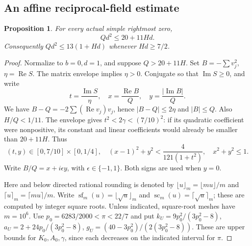 \documentclass[11pt,reqno]{amsart}
\numberwithin{equation}{section}
\newtheorem{proposition}[theorem]{Proposition}
\theoremstyle{definition}
\theoremstyle{remark}
\renewcommand{\Re}{\operatorname{Re}}
\renewcommand{\Im}{\operatorname{Im}}
\begin{document}
\subsection{An affine reciprocal-field estimate}

\begin{proposition}\label{mf:affine}
For every actual simple rightmost zero,
\begin{equation}\label{mf:affine-bound}
 Qd^2\le20+11Hd.
\end{equation}
Consequently $Qd^2\le13(1+Hd)$ whenever $Hd\ge7/2$.
\end{proposition}

\begin{proof}
Normalize to $b=0,d=1$, and suppose $Q>20+11H$.
Set $B=-\sum v_j^2$, $\eta=\Re S$.
The matrix envelope implies $\eta>0$. Conjugate so that
$\Im S\ge0$, and write
\[
 t=\frac{\Im S}{\eta},\quad
 x=\frac{\Re B}{Q},\quad y=\frac{|\Im B|}{Q}.
\]
We have $B-Q=-2\sum(\Re v_j)v_j$, hence
$|B-Q|\le2\eta$ and $|B|\le Q$. Also
$H/Q<1/11$. The envelope gives
$t^2<2\gamma<(7/10)^2$: if its quadratic coefficient were
nonpositive, its constant and linear coefficients would already
be smaller than $20+11H$. Thus
\begin{equation}\label{mf:affine-domain}
 (t,y)\in[0,7/10]\times[0,1/4],\quad
 (x-1)^2+y^2<\frac4{121(1+t^2)},\quad x^2+y^2\le1.
\end{equation}
Write $B/Q=x+i\epsilon y$, with $\epsilon\in\{-1,1\}$.
Both signs are used when $y=0$.

Here and below directed rational rounding is denoted by
$\lfloor u\rfloor_m=\lfloor mu\rfloor/m$ and
$\lceil u\rceil_m=\lceil mu\rceil/m$. Write
$\operatorname{sf}_m(u)=\lfloor\sqrt u\rfloor_m$ and
$\operatorname{sc}_m(u)=\lceil\sqrt u\rceil_m$; these are computed
by integer square roots. Unless indicated, square-root meshes
have $m=10^6$. Use $p_0=6283/2000<\pi<22/7$ and put
$k_U=9p_0^2/(3p_0^2-8)$,
$a_U=2+24p_0/(3p_0^2-8)$,
$g_U=(40-3p_0^2)/(2(3p_0^2-8))$.
These are upper bounds for $K_0,A_0,\gamma$, since each decreases
on the indicated interval for $\pi$.


\end{proof}
\end{document}
